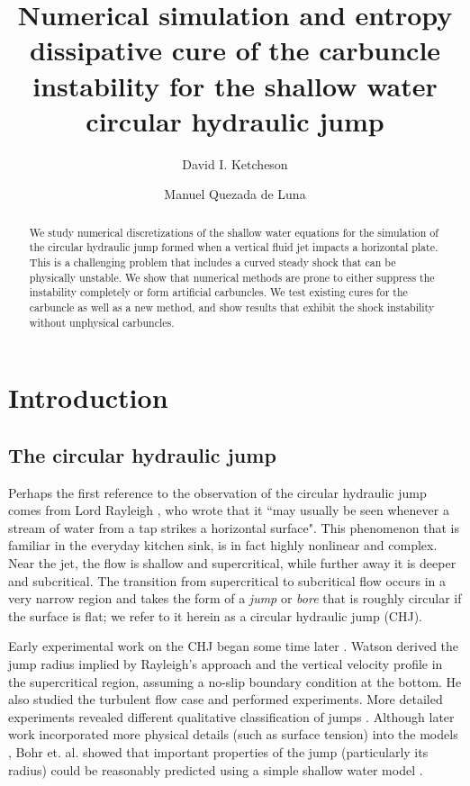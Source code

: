 \documentclass[preprint, 11pt]{article}
\title{Numerical simulation and entropy dissipative cure of the 
  carbuncle instability for the shallow water circular hydraulic jump}
\author{
    David I. Ketcheson \and
    Manuel Quezada de Luna
}
\begin{document}
\maketitle

\begin{abstract}
We study numerical discretizations of the shallow water equations
for the simulation of the circular hydraulic jump formed
when a vertical fluid jet impacts a horizontal plate.  
This is a challenging problem that includes a curved steady shock
that can be physically unstable.  We show that numerical methods are prone to
either suppress the instability completely or form artificial carbuncles.
We test existing cures for the carbuncle as well as a new method,
and show results that exhibit the shock instability without unphysical carbuncles.
\end{abstract}



\section{Introduction}

\subsection{The circular hydraulic jump}

Perhaps the first reference to the observation of the circular hydraulic jump
comes from Lord Rayleigh \cite{rayleigh1914theory}, who wrote that it
``may usually be seen whenever a stream of water from a tap strikes a horizontal
surface".  This phenomenon that is familiar in the everyday kitchen sink, is in
fact highly nonlinear and complex.  Near the jet, the flow is shallow and
supercritical, while further away it is deeper and subcritical.  The transition from supercritical
to subcritical flow
occurs in a very narrow region and takes the form of a \emph{jump} or \emph{bore}
that is roughly circular if the surface is flat; we refer to it herein as a
circular hydraulic jump (CHJ).

Early experimental work on the CHJ began some time later
\cite{kurihara1946hydraulic,tani1949water,watson1964radial}.
Watson \cite{watson1964radial} derived the jump radius
implied by Rayleigh's approach and the vertical
velocity profile in the supercritical region, assuming a no-slip
boundary condition at the bottom.  He also studied the turbulent
flow case and performed experiments.
More detailed experiments revealed different qualitative classification
of jumps  \cite{ishigai1977heat,craik1981circular}.
Although later work incorporated more physical details (such as surface tension) into the models
\cite{bush2003influence}, Bohr et. al. showed that important properties of the jump
(particularly its radius) could be reasonably predicted using a simple shallow water
model \cite{bohr1993shallow}.
\end{document}
